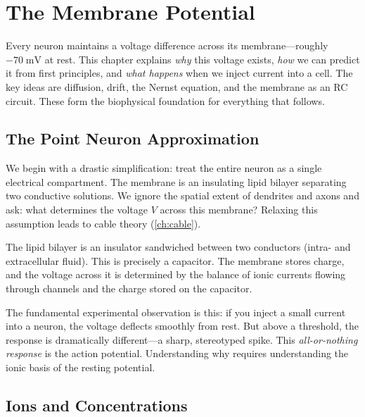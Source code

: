 \chapter{The Membrane Potential}
\label{ch:membrane}

\begin{chapterabstract}
Every neuron maintains a voltage difference across its membrane---roughly $-70\;\text{mV}$ at rest. This chapter explains \emph{why} this voltage exists, \emph{how} we can predict it from first principles, and \emph{what happens} when we inject current into a cell. The key ideas are diffusion, drift, the Nernst equation, and the membrane as an RC circuit. These form the biophysical foundation for everything that follows.
\end{chapterabstract}

\section{The Point Neuron Approximation}
\label{sec:point-neuron}

We begin with a drastic simplification: treat the entire neuron as a single electrical compartment. The membrane is an insulating lipid bilayer separating two conductive solutions. We ignore the spatial extent of dendrites and axons and ask: what determines the voltage $V$ across this membrane? Relaxing this assumption leads to cable theory (\cref{ch:cable}).

\begin{aside}
The lipid bilayer is an insulator sandwiched between two conductors (intra- and extracellular fluid). This is precisely a capacitor. The membrane stores charge, and the voltage across it is determined by the balance of ionic currents flowing through channels and the charge stored on the capacitor.
\end{aside}

The fundamental experimental observation is this: if you inject a small current into a neuron, the voltage deflects smoothly from rest. But above a threshold, the response is dramatically different---a sharp, stereotyped spike. This \emph{all-or-nothing response} is the action potential. Understanding why requires understanding the ionic basis of the resting potential.

\section{Ions and Concentrations}
\label{sec:ions}

